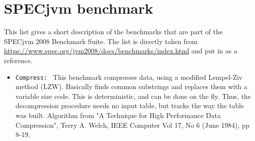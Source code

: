 \section{SPECjvm benchmark}
\label{a:specjvm_benchmark}
This list gives a short description of the benchmarks that are part of the SPECjvm 2008 Benchmark Suite.
The list is directly taken from \url{https://www.spec.org/jvm2008/docs/benchmarks/index.html} and put in as a reference.
\begin{itemize}
  \item \texttt{Compress: } This benchmark compresses data, using a modified Lempel-Ziv method (LZW). Basically finds common substrings and replaces them with a variable size code. This is deterministic, and can be done on the fly. Thus, the decompression procedure needs no input table, but tracks the way the table was built. Algorithm from "A Technique for High Performance Data Compression", Terry A. Welch, IEEE Computer Vol 17, No 6 (June 1984), pp 8-19.


\end{itemize}
